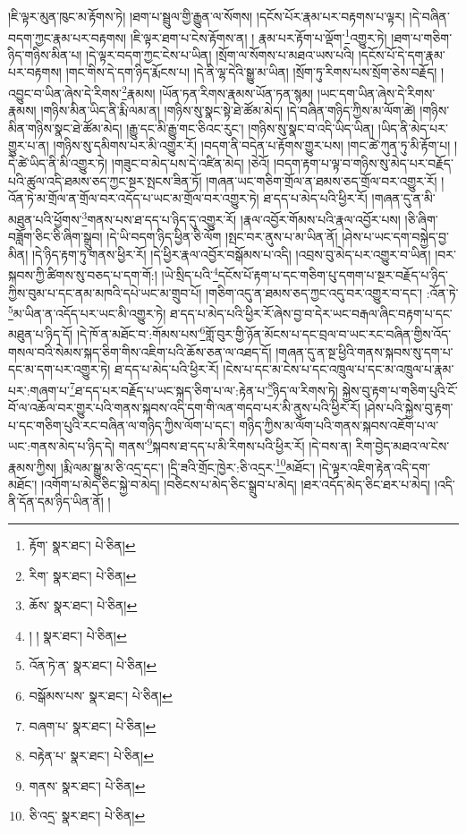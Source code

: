 །ཇི་ལྟར་མུན་ཁུང་མ་རྟོགས་ཏེ། །ཐག་པ་སྦྲུལ་གྱི་རྒྱུན་ལ་སོགས། །དངོས་པོར་རྣམ་པར་བརྟགས་པ་ལྟར། །དེ་བཞིན་བདག་ཀྱང་རྣམ་པར་བརྟགས། །ཇི་ལྟར་ཐག་པ་ངེས་རྟོགས་ན། །
རྣམ་པར་རྟོག་པ་ལྡོག་\footnote{རྟོག་  སྣར་ཐང་།  པེ་ཅིན། }འགྱུར་ཏེ། །ཐག་པ་གཅིག་ཉིད་གཉིས་མིན་པ། །དེ་ལྟར་བདག་ཀྱང་ངེས་པ་ཡིན། །སྲོག་ལ་སོགས་པ་མཐའ་ཡས་པའི། །དངོས་པོ་དེ་དག་རྣམ་པར་བརྟགས། །གང་གིས་དེ་དག་ཉིད་རྨོངས་པ། །དེ་ནི་ལྷ་དེའི་སྒྱུ་མ་ཡིན། །སྲོག་ཏུ་རིགས་པས་སྲོག་ཅེས་བརྗོད། །འབྱུང་བ་ཡིན་ཞེས་དེ་རིགས་\footnote{རིག་  སྣར་ཐང་།  པེ་ཅིན། }རྣམས། །ཡོན་ཏན་རིགས་རྣམས་ཡོན་ཏན་སྙམ། །ཡང་དག་ཡིན་ཞེས་དེ་རིགས་རྣམས། །གཉིས་མིན་ཡིད་ནི་རྨི་ལམ་ན། །གཉིས་སུ་སྣང་སྟེ་ཐེ་ཚོམ་མེད། །དེ་བཞིན་གཉིད་ཀྱིས་མ་ལོག་ཚེ། །གཉིས་མིན་གཉིས་སྣང་ཐེ་ཚོམ་མེད། །རྒྱུ་དང་མི་རྒྱུ་གང་ཅིའང་རུང་། །གཉིས་སུ་སྣང་བ་འདི་ཡིད་ཡིན། །ཡིད་ནི་མེད་པར་གྱུར་པ་ན། །གཉིས་སུ་དམིགས་པར་མི་འགྱུར་རོ། །བདག་ནི་བདེན་པ་རྟོགས་གྱུར་པས། །གང་ཚེ་ཀུན་ཏུ་མི་རྟོག་པ། །དེ་ཚེ་ཡིད་ནི་མི་འགྱུར་ཏེ། །གཟུང་བ་མེད་པས་དེ་འཛིན་མེད། །ཅེའོ། །བདག་རྟག་པ་ལྟ་བ་གཉིས་སུ་མེད་པར་བརྗོད་པའི་ཚུལ་འདི་ཐམས་ཅད་ཀྱང་སྔར་སྤངས་ཟིན་ཏོ། །གཞན་ཡང་གཅིག་གྲོལ་ན་ཐམས་ཅད་གྲོལ་བར་འགྱུར་རོ། །འོན་ཏེ་མ་གྲོལ་ན་གྲོལ་བར་འདོད་པ་ཡང་མ་གྲོལ་བར་འགྱུར་ཏེ། ཐ་དད་པ་མེད་པའི་ཕྱིར་རོ། །གཞན་དུ་ན་མི་མཐུན་པའི་ཕྱོགས་\footnote{ཆོས་  སྣར་ཐང་།  པེ་ཅིན། }གནས་པས་ཐ་དད་པ་ཉིད་དུ་འགྱུར་རོ། །རྣལ་འབྱོར་གོམས་པའི་རྣལ་འབྱོར་པས། །ཅི་ཞིག་བཟློག་ཅིང་ཅི་ཞིག་སྒྲུབ། །དེ་ཡི་བདག་ཉིད་ཕྱིན་ཅི་ལོག །སྤང་བར་ནུས་པ་མ་ཡིན་ནོ། །ཤེས་པ་ཡང་དག་བསྐྱེད་བྱ་མིན། །དེ་ཉིད་རྟག་ཏུ་གནས་ཕྱིར་རོ། །དེ་ཕྱིར་རྣལ་འབྱོར་བསྒོམས་པ་འདི། །འབྲས་བུ་མེད་པར་འགྱུར་བ་ཡིན། །བར་སྐབས་ཀྱི་ཚིགས་སུ་བཅད་པ་དག་གོ:། །ཡེ་སྲིད་པའི་\footnote{། །  སྣར་ཐང་།  པེ་ཅིན། }དངོས་པོ་རྟག་པ་དང་གཅིག་པུ་དགག་པ་སྔར་བརྗོད་པ་ཉིད་ཀྱིས་བུམ་པ་དང་ནམ་མཁའི་དཔེ་ཡང་མ་གྲུབ་པོ། །གཅིག་འདུ་ན་ཐམས་ཅད་ཀྱང་འདུ་བར་འགྱུར་བ་དང་། :འོན་ཏེ་\footnote{འོན་ཏེ་ན་  སྣར་ཐང་།  པེ་ཅིན། }མ་ཡིན་ན་འདོད་པར་ཡང་མི་འགྱུར་ཏེ། ཐ་དད་པ་མེད་པའི་ཕྱིར་རོ་ཞེས་བྱ་བ་དེར་ཡང་བརྒལ་ཞིང་བརྟག་པ་དང་མཐུན་པ་ཉིད་དོ། །དེ་ཁོ་ན་མཐོང་བ་:གོམས་པས་\footnote{བསྒོམས་པས་  སྣར་ཐང་།  པེ་ཅིན། }གློ་བུར་གྱི་ཉོན་མོངས་པ་དང་བྲལ་བ་ཡང་རང་བཞིན་གྱིས་འོད་གསལ་བའི་སེམས་སྐད་ཅིག་གིས་འཇིག་པའི་ཆོས་ཅན་ལ་འཐད་དོ། །གཞན་དུ་ན་སྔ་ཕྱིའི་གནས་སྐབས་སུ་དག་པ་དང་མ་དག་པར་འགྱུར་ཏེ། ཐ་དད་པ་མེད་པའི་ཕྱིར་རོ། །ངེས་པ་དང་མ་ངེས་པ་དང་འཁྲུལ་པ་དང་མ་འཁྲུལ་པ་རྣམ་པར་:གཞག་པ་\footnote{བཞག་པ་  སྣར་ཐང་།  པེ་ཅིན། }ཐ་དད་པར་བརྗོད་པ་ཡང་སྐད་ཅིག་པ་ལ་:རྟེན་པ་\footnote{བརྟེན་པ་  སྣར་ཐང་།  པེ་ཅིན། }ཉིད་ལ་རིགས་ཏེ། སྐྱེས་བུ་རྟག་པ་གཅིག་པུའི་ངོ་བོ་ལ་འཆོལ་བར་གྱུར་པའི་གནས་སྐབས་འདི་དག་གི་ལན་གདབ་པར་མི་ནུས་པའི་ཕྱིར་རོ། །ཤེས་པའི་སྐྱེས་བུ་རྟག་པ་དང་གཅིག་པུའི་རང་བཞིན་ལ་གཉིད་ཀྱིས་ལོག་པ་དང་། གཉིད་ཀྱིས་མ་ལོག་པའི་གནས་སྐབས་འཇོག་པ་ལ་ཡང་:གནས་མེད་པ་ཉིད་དེ། གནས་\footnote{གནས་  སྣར་ཐང་།  པེ་ཅིན། }སྐབས་ཐ་དད་པ་མི་རིགས་པའི་ཕྱིར་རོ། །དེ་བས་ན། རིག་བྱེད་མཐའ་ལ་ངེས་རྣམས་ཀྱིས། །རྨི་ལམ་སྒྱུ་མ་ཅི་འདྲ་དང་། །དྲི་ཟའི་གྲོང་ཁྱེར་:ཅི་འདྲར་\footnote{ཅི་འདྲ་  སྣར་ཐང་།  པེ་ཅིན། }མཐོང་། །དེ་ལྟར་འཇིག་རྟེན་འདི་དག་མཐོང་། །འགོག་པ་མེད་ཅིང་སྐྱེ་བ་མེད། །བཅིངས་པ་མེད་ཅིང་སྒྲུབ་པ་མེད། །ཐར་འདོད་མེད་ཅིང་ཐར་པ་མེད། །འདི་ནི་དོན་དམ་ཉིད་ཡིན་ནོ། །
